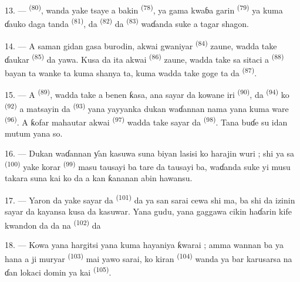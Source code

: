 13. ---  \textsuperscript{(80)}, wanda yake tsaye
a bakin  \textsuperscript{(78)}, ya gama kwaɓa
garin  \textsuperscript{(79)} ya kuma ɗauko daga tanda
 \textsuperscript{(81)}, da  \textsuperscript{(82)} da 
\textsuperscript{(83)} waɗanda suke a tagar shagon.

14. --- A saman gidan gasa burodin, akwai gwaniyar  \textsuperscript{(84)} zaune, wadda take ɗaukar  \textsuperscript{(85)} da yawa. Kusa da ita akwai  \textsuperscript{(86)} zaune, wadda take sa sitaci a
 \textsuperscript{(88)} bayan ta wanke ta kuma shanya
ta, kuma wadda take goge ta da 
\textsuperscript{(87)}.

\VUsaut{4.0mm}
\VUsaut{3.0mm}

15. --- A  \textsuperscript{(89)}, wadda take a benen ƙasa,
ana sayar da kowane iri 
\textsuperscript{(90)}, da  \textsuperscript{(94)} ko
 \textsuperscript{(92)} a matsayin  da 
 \textsuperscript{(93)} yana yayyanka dukan
waɗannan nama yana kuma ware 
\textsuperscript{(96)}. A ƙofar mahautar akwai  \textsuperscript{(97)} wadda take sayar da
 \textsuperscript{(98)}. Tana buɗe su idan mutum
yana so.

16. --- Dukan waɗannan ƴan kasuwa suna biyan lasisi ko harajin wuri ;
shi ya sa  \textsuperscript{(100)} yake korar
 \textsuperscript{(99)} masu
tausayi ba tare da tausayi ba, waɗanda suke yi musu takara suna kai
 ko
 da  a kan ƙananan abin hawansu.

\VUsaut{4.0mm}
\VUsaut{3.0mm}

17. --- Yaron da yake sayar da  \textsuperscript{(101)} da
 ya san sarai cewa shi ma, ba shi da izinin sayar da
kayansa kusa da kasuwar. Yana gudu, yana gaggawa cikin haɗarin kife
kwandon  da  da  na  \textsuperscript{(102)}  da 

18. --- Kowa yana hargitsi yana kuma hayaniya ƙwarai ; amma wannan ba
ya hana a ji muryar  \textsuperscript{(103)} mai
yawo sarai, ko kiran  \textsuperscript{(104)}
wanda ya bar karusarsa na ɗan lokaci domin ya kai  \textsuperscript{(105)}.

\VUsaut{6.0mm}
\VUfilet{22mm}
